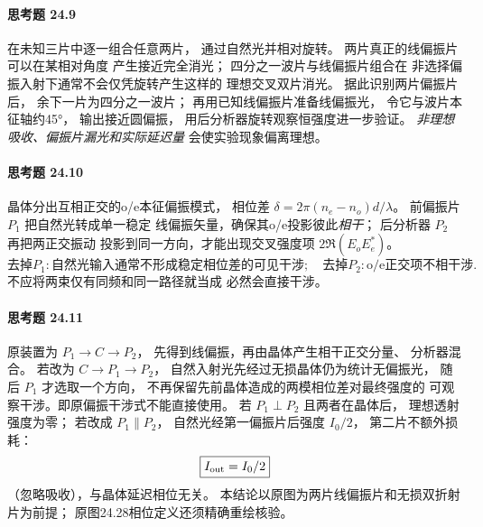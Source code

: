 \paragraph{思考题 24.9}
在未知三片中逐一组合任意两片，
通过自然光并相对旋转。
两片真正的线偏振片可以在某相对角度
产生接近完全消光；
四分之一波片与线偏振片组合在
非选择偏振入射下通常不会仅凭旋转产生这样的
理想交叉双片消光。
据此识别两片偏振片后，
余下一片为四分之一波片；
再用已知线偏振片准备线偏振光，
令它与波片本征轴约45°，
输出接近圆偏振，
用后分析器旋转观察恒强度进一步验证。
\emph{非理想吸收、偏振片漏光和实际延迟量}
会使实验现象偏离理想。

\paragraph{思考题 24.10}
晶体分出互相正交的o/e本征偏振模式，
相位差
\(\delta=2\pi(n_e-n_o)d/\lambda\)。
前偏振片 \(P_1\) 把自然光转成单一稳定
线偏振矢量，确保其o/e投影彼此\emph{相干}；
后分析器 \(P_2\) 再把两正交振动
投影到同一方向，才能出现交叉强度项
\(2\Re(E_oE_e^*)\)。
\[
\boxed{\text{去掉}P_1:
\text{自然光输入通常不形成稳定相位差的可见干涉};
\quad \text{去掉}P_2:\text{o/e正交项不相干涉}.}
\]
不应将两束仅有同频和同一路径就当成
必然会直接干涉。

\paragraph{思考题 24.11}
原装置为
\(P_1\to C\to P_2\)，
先得到线偏振，再由晶体产生相干正交分量、
分析器混合。
若改为
\(\boxed{C\to P_1\to P_2}\)，
自然入射光先经过无损晶体仍为统计无偏振光，
随后 \(P_1\) 才选取一个方向，
不再保留先前晶体造成的两模相位差对最终强度的
可观察干涉。即原偏振干涉式不能直接使用。
若 \(P_1\perp P_2\) 且两者在晶体后，
理想透射强度为零；
若改成 \(P_1\parallel P_2\)，
自然光经第一偏振片后强度 \(I_0/2\)，
第二片不额外损耗：
\[
\boxed{I_{\rm out}=I_0/2}
\]
（忽略吸收），与晶体延迟相位无关。
本结论以原图为两片线偏振片和无损双折射片为前提；
原图24.28相位定义还须精确重绘核验。
